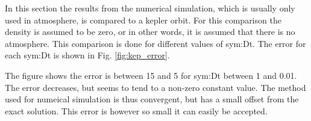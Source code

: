 In this section the results from the numerical simulation, which is usually only used in atmosphere, is compared to a kepler orbit. For this comparison the density is assumed to be zero, or in other words, it is assumed that there is no atmosphere. This comparison is done for different values of \gls{sym:Dt}. The error for each \gls{sym:Dt} is shown in Fig. \ref{fig:kep_error}.


The figure shows the error is between 15 and 5 for \gls{sym:Dt} between 1 and 0.01. The error decreases, but seems to tend to a non-zero constant value. The method used for numeical simulation is thus convergent, but has a small offset from the exact solution. This error is however so small it can easily be accepted.


